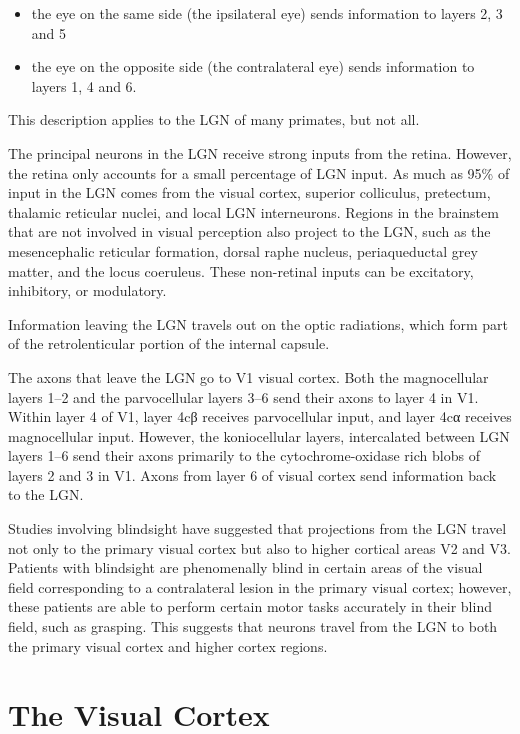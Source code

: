 \begin{itemize}
\tightlist
\item
  the eye on the same side (the ipsilateral eye) sends information to layers 2, 3 and 5
\item
  the eye on the opposite side (the contralateral eye) sends information to layers 1, 4 and 6.
\end{itemize}

This description applies to the LGN of many primates, but not all.

The principal neurons in the LGN receive strong inputs from the retina. However, the retina only accounts for a small percentage of LGN input. As much as 95\% of input in the LGN comes from the visual cortex, superior colliculus, pretectum, thalamic reticular nuclei, and local LGN interneurons. Regions in the brainstem that are not involved in visual perception also project to the LGN, such as the mesencephalic reticular formation, dorsal raphe nucleus, periaqueductal grey matter, and the locus coeruleus. These non-retinal inputs can be excitatory, inhibitory, or modulatory.

Information leaving the LGN travels out on the optic radiations, which form part of the retrolenticular portion of the internal capsule.

The axons that leave the LGN go to V1 visual cortex. Both the magnocellular layers 1--2 and the parvocellular layers 3--6 send their axons to layer 4 in V1. Within layer 4 of V1, layer 4cβ receives parvocellular input, and layer 4cα receives magnocellular input. However, the koniocellular layers, intercalated between LGN layers 1--6 send their axons primarily to the cytochrome-oxidase rich blobs of layers 2 and 3 in V1. Axons from layer 6 of visual cortex send information back to the LGN.

Studies involving blindsight have suggested that projections from the LGN travel not only to the primary visual cortex but also to higher cortical areas V2 and V3. Patients with blindsight are phenomenally blind in certain areas of the visual field corresponding to a contralateral lesion in the primary visual cortex; however, these patients are able to perform certain motor tasks accurately in their blind field, such as grasping. This suggests that neurons travel from the LGN to both the primary visual cortex and higher cortex regions.

\hypertarget{the-visual-cortex}{%
\section{The Visual Cortex}\label{the-visual-cortex}}

